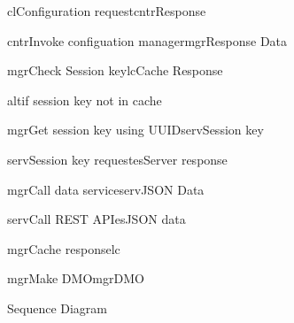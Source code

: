 \begin{figure}[h]
\begin{center}

	\resizebox{1.0\textwidth}{0.7\textwidth} {

	\begin{sequencediagram}

	\begin{call}{cl}{Configuration request}{cntr}{Response}

		\begin{call}{cntr}{Invoke configuation manager}{mgr}{Response Data}
			\begin{call}{mgr}{Check Session key}{lc}{Cache Response}\end{call}
			\begin{sdblock}{alt}{if session key not in cache}
				\begin{call}{mgr}{Get session key using UUID}{serv}{Session key}
					\begin{call}{serv}{Session key request}{es}{Server response}
					\end{call}
				\end{call}
			\end{sdblock}
			\begin{call}{mgr}{Call data service}{serv}{JSON Data}
				\begin{call}{serv}{Call REST API}{es}{JSON data}
				\end{call}
			\end{call}
			\begin{call}{mgr}{Cache response}{lc}{}
			\end{call}
			\begin{call}{mgr}{Make DMO}{mgr}{DMO}\end{call}
		\end{call}

	\end{call}

	\end{sequencediagram}
	}

\end{center}
\caption{Sequence Diagram}
\label{fig:arch_uml}
\end{figure}

